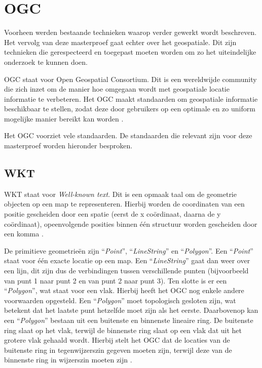 \section{OGC}
\label{sec:ogc}

Voorheen werden bestaande technieken waarop verder gewerkt wordt beschreven. Het vervolg van deze masterproef gaat echter over het geospatiale. Dit zijn technieken die gerespecteerd en toegepast moeten worden om zo het uiteindelijke onderzoek te kunnen doen. 

OGC staat voor Open Geospatial Consortium. Dit is een wereldwijde community die zich inzet om de manier hoe omgegaan wordt met geospatiale locatie informatie te verbeteren. Het OGC maakt standaarden om geospatiale informatie beschikbaar te stellen, zodat deze door gebruikers op een optimale en zo uniform mogelijke manier bereikt kan worden \cite{ogcdocs}.

Het OGC voorziet vele standaarden. De standaarden die relevant zijn voor deze masterproef worden hieronder besproken.

\subsection{WKT}
WKT staat voor \textit{Well-known text}. Dit is een opmaak taal om de geometrie objecten op een map te representeren. Hierbij worden de coordinaten van een positie gescheiden door een spatie (eerst de x coördinaat, daarna de y coördinaat), opeenvolgende posities binnen één structuur worden gescheiden door een komma \cite{ogcdocs}. 

De primitieve geometrieën zijn ``\textit{Point}'', ``\textit{LineString}'' en ``\textit{Polygon}''. Een ``\textit{Point}'' staat voor één exacte locatie op een map. Een ``\textit{LineString}'' gaat dan weer over een lijn, dit zijn dus de verbindingen tussen verschillende punten (bijvoorbeeld van punt 1 naar punt 2 en van punt 2 naar punt 3). Ten slotte is er een ``\textit{Polygon}'', wat staat voor een vlak. Hierbij heeft het OGC nog enkele andere voorwaarden opgesteld. Een ``\textit{Polygon}'' moet topologisch gesloten zijn, wat betekent dat het laatste punt hetzelfde moet zijn als het eerste. Daarbovenop kan een ``\textit{Polygon}'' bestaan uit een buitenste en binnenste lineaire ring. De buitenste ring slaat op het vlak, terwijl de binnenste ring slaat op een vlak dat uit het grotere vlak gehaald wordt. Hierbij stelt het OGC dat de locaties van de buitenste ring in tegenwijzerszin gegeven moeten zijn, terwijl deze van de binnenste ring in wijzerszin moeten zijn \cite{ogcdocs}.

